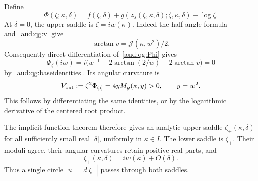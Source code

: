 \documentclass[11pt,a4paper]{article}
\numberwithin{equation}{section}
\begin{document}
Define
\begin{equation}\label{aud:qg:Phi}
 \Phi(\zeta;\kappa,\delta)
 =f(\zeta,\delta)+g(z_s(\zeta,\kappa,\delta);\zeta,\kappa,\delta)-\log\zeta.
\end{equation}
At $\delta=0$, the upper saddle is $\zeta=iw(\kappa)$. Indeed the half-angle formula and~\eqref{aud:qg:v} give
\[
 \arctan v=\mathcal J(\kappa,w^2)/2.
\]
Consequently direct differentiation of~\eqref{aud:qg:Phi} gives
\[
 \Phi_\zeta(iw)=i\bigl(w^{-1}-2\arctan(2/w)-2\arctan v\bigr)=0
\]
by~\eqref{aud:qg:baseidentities}. Its angular curvature is
\begin{equation}\label{aud:qg:outerbase}
 V_{\rm out}:=\zeta^2\Phi_{\zeta\zeta}
 =4yM_y(\kappa,y)>0,\qquad y=w^2.
\end{equation}
This follows by differentiating the same identities, or by the logarithmic derivative of the centered root product.

The implicit-function theorem therefore gives an analytic upper saddle $\zeta_+(\kappa,\delta)$ for all sufficiently small real $|\delta|$, uniformly in $\kappa\in I$. The lower saddle is $\overline{\zeta_+}$. Their moduli agree, their angular curvatures retain positive real parts, and
\[
 \zeta_+(\kappa,\delta)=iw(\kappa)+O(\delta).
\]
Thus a single circle $|u|=d|\zeta_+|$ passes through both saddles.
\end{document}
